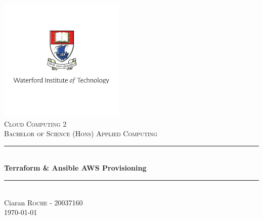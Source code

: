 \begin{titlepage}

\newcommand{\HRule}{\rule{\linewidth}{0.5mm}}

\center

\includegraphics{images/logo.png}\\
\textsc{\Large Cloud Computing 2}\\[0.5cm]
\textsc{\large Bachelor of Science (Hons) Applied Computing }\\[0.5cm] 


\HRule \\[0.4cm]
{ \huge \bfseries Terraform \& Ansible AWS Provisioning}\\[0.4cm] 
\HRule \\[1.5cm]

\Large Ciaran \textsc{Roche} - 20037160\\[3cm]


{\large \today}\\[1cm]

\vfill 

\end{titlepage}
